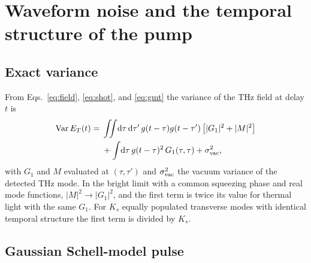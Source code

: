 \documentclass[aps,pra,reprint,superscriptaddress,amsmath,amssymb,floatfix]{revtex4-2}
\newcommand{\dd}{\mathrm{d}}
\newcommand{\Var}{\operatorname{Var}}
\begin{document}
\section{Waveform noise and the temporal structure of the pump}
\label{sec:noise}

\subsection{Exact variance}

From Eqs.~\eqref{eq:field}, \eqref{eq:shot}, and \eqref{eq:gmt} the variance of
the THz field at delay $t$ is
\begin{align}
\Var E_T(t)={}&\iint\!\dd\tau\,\dd\tau'\,g(t-\tau)g(t-\tau')
\left[|G_1|^2+|M|^2\right]\nonumber\\
&+\int\!\dd\tau\,g(t-\tau)^2\,G_1(\tau,\tau)+\sigma_{\rm vac}^2 ,
\label{eq:var}
\end{align}
with $G_1$ and $M$ evaluated at $(\tau,\tau')$ and $\sigma_{\rm vac}^2$ the
vacuum variance of the detected THz mode. In the bright limit with a common
squeezing phase and real mode functions, $|M|^2\to|G_1|^2$, and the first
term is twice its value for thermal light with the same $G_1$. For $K_s$
equally populated transverse modes with identical temporal structure the
first term is divided by $K_s$.

\subsection{Gaussian Schell-model pulse}
\end{document}
